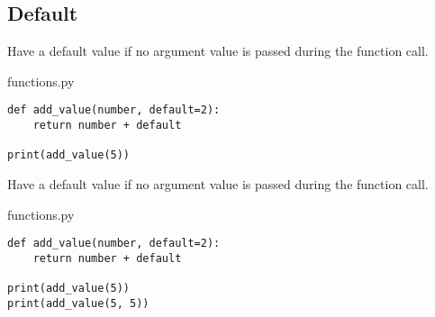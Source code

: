 \documentclass[aspectratio=1610,slidestop]{beamer}
\begin{document}
\subsection{Default}
\begin{pframe}
 Have a default value if no argument value is passed during the function call.
 \medskip

 \begin{minipage}[t]{0.47\textwidth}
  \begin{pythonfile}{functions.py}
   \begin{verbatim}
def add_value(number, default=2):
    return number + default

print(add_value(5))
   \end{verbatim}
  \end{pythonfile}
 \end{minipage}\qquad
 \begin{minipage}[t]{0.47\textwidth}
  \vspace{-2.6cm}
  \begin{terminal}
  \end{terminal}
 \end{minipage}
\end{pframe}


\begin{pframe}
 Have a default value if no argument value is passed during the function call.
 \medskip

 \begin{minipage}[t]{0.47\textwidth}
  \begin{pythonfile}{functions.py}
   \begin{verbatim}
def add_value(number, default=2):
    return number + default

print(add_value(5))
print(add_value(5, 5))
   \end{verbatim}
  \end{pythonfile}
 \end{minipage}\qquad
 \begin{minipage}[t]{0.47\textwidth}
  \vspace{-3.05cm}
  \begin{terminal}
  \end{terminal}
 \end{minipage}
\end{pframe}
\end{document}
